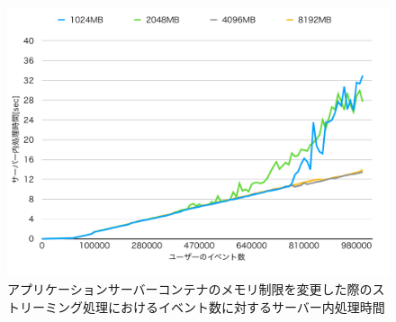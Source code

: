\documentclass[../../../../../main]{subfiles}
\begin{document}
    \begin{figure}[H]
        \centering
        \includegraphics[width=12cm]{graph}
        \caption{アプリケーションサーバーコンテナのメモリ制限を変更した際のストリーミング処理におけるイベント数に対するサーバー内処理時間}
        \label{fig:stream-change-app-memory-limit-server-time-app_4_db_1_1024}
    \end{figure}
\end{document}
